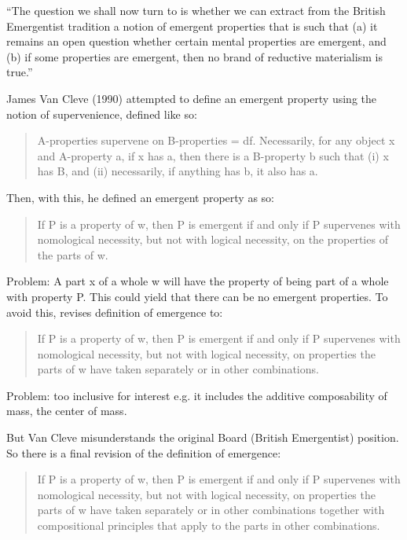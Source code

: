 \documentclass{article}
\begin{document}
``The question we shall now turn to is whether we can extract from the British Emergentist tradition a notion of emergent properties that is such that (a) it remains an open question whether certain mental properties are emergent, and (b) if some properties are emergent, then no brand of reductive materialism is true.''

James Van Cleve (1990) attempted to define an emergent property using the notion of supervenience, defined like so:

\begin{quote}
A-properties supervene on B-properties = df. Necessarily, for any object x and A-property a, if x has a, then there is a B-property b such that (i) x has B, and (ii) necessarily, if anything has b, it also has a.
\end{quote}

Then, with this, he defined an emergent property as so:

\begin{quote}
If P is a property of w, then P is emergent if and only if P supervenes with nomological necessity, but not with logical necessity, on the properties of the parts of w.
\end{quote}

Problem: A part x of a whole w will have the property of being part of a whole with property P. This could yield that there can be no emergent properties. To avoid this, revises definition of emergence to:

\begin{quote}
If P is a property of w, then P is emergent if and only if P supervenes with nomological necessity, but not with logical necessity, on properties the parts of w have taken separately or in other combinations.
\end{quote}

Problem: too inclusive for interest e.g. it includes the additive composability of mass, the center of mass.

But Van Cleve misunderstands the original Board (British Emergentist) position. So there is a final revision of the definition of emergence:

\begin{quote}
If P is a property of w, then P is emergent if and only if P supervenes with nomological necessity, but not with logical necessity, on properties the parts of w have taken separately or in other combinations together with compositional principles that apply to the parts in other combinations.
\end{quote}
\end{document}
